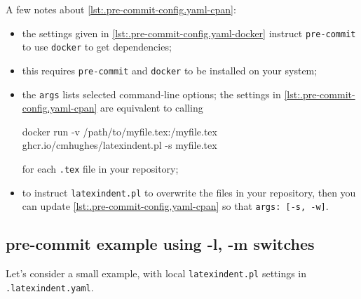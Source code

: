   A few notes about \cref{lst:.pre-commit-config.yaml-cpan}:
  \begin{itemize}
   \item the settings given in \cref{lst:.pre-commit-config.yaml-docker} instruct
         \texttt{pre-commit} to use \texttt{docker} to get dependencies;
   \item this requires \texttt{pre-commit} and \texttt{docker} to be installed on your system;
   \item the \texttt{args} lists selected command-line options; the settings in
         \cref{lst:.pre-commit-config.yaml-cpan} are equivalent to calling

         \begin{commandshell}
docker run -v /path/to/myfile.tex:/myfile.tex ghcr.io/cmhughes/latexindent.pl -s myfile.tex
\end{commandshell}

         for each \texttt{.tex} file in your repository;
   \item to instruct \texttt{latexindent.pl} to overwrite the files in your repository, then you
         can update \cref{lst:.pre-commit-config.yaml-cpan} so that \texttt{args: [-s, -w]}.
  \end{itemize}

 \subsection{pre-commit example using -l, -m switches}
  Let's consider a small example, with local \texttt{latexindent.pl} settings in
  \texttt{.latexindent.yaml}.

